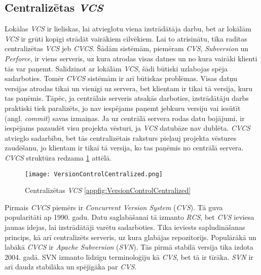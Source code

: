 \subsection{Centralizētas \textit{VCS}}
Lokālas \textit{VCS} ir lieliskas, lai atvieglotu viena izstrādātāja darbu, bet ar lokālām \textit{VCS} ir grūti kopīgi strādāt vairākiem cilvēkiem. Lai to atrisinātu, tika radītas centralizētas \textit{VCS} jeb \textit{CVCS}. Šādām sistēmām, piemēram \textit{CVS}, \textit{Subversion} un \textit{Perforce}, ir viens serveris, uz kura atrodas visas datnes un no kura vairāki klienti tās var paņemt. Salīdzinot ar lokālām \textit{VCS}, šādi būtiski uzlabojas spēja sadarboties. Tomēr \textit{CVCS} sistēmām ir arī būtiskas problēmas. Visas datņu versijas atrodas tikai un vienīgi uz servera, bet klientam ir tikai tā versija, kuru tas paņēmis. Tāpēc, ja centrālais serveris atsakās darboties, izstrādātāju darbs praktiski tiek paralizēts, jo nav iespējams paņemt jebkuru versiju vai iesūtīt (angl. \textit{commit}) savas izmaiņas. Ja uz centrālā servera rodas datu bojājumi, ir iespējams pazaudēt visu projekta vēsturi, ja \textit{VCS} datubāze nav dublēta.
\textit{CVCS} atvieglo sadarbību, bet tās centralizētais raksturs pieļauj projekta vēstures zaudēšanu, jo klientam ir tikai tā versija, ko tas paņēmis no centrālā servera. \textit{CVCS} struktūra redzama \ref{fig:VersionControlCentralized} attēlā. \cite{chacon2014progit}
\begin{figure}[H]%
	\centering
	\captionsetup{justification=centering}
	\texttt{[image: VersionControlCentralized.png]}
	\caption{Centralizētas \textit{VCS} \ref{appfig:VersionControlCentralized}}
	\label{fig:VersionControlCentralized}
\end{figure}
Pirmais \textit{CVCS} piemērs ir \textit{Concurrent Version System} (\textit{CVS}). Tā guva popularitāti ap 1990. gadu. Datu saglabāšanai tā izmanto \textit{RCS}, bet \textit{CVS} ieviesa jaunas idejas, lai izstrādātāji varētu sadarboties. Tika ieviests sapludināšanas princips, kā arī centralizēts serveris, uz kura glabājas repozitorijs.
Populārākā un labākā \textit{CVCS} ir \textit{Apache Subversion} (\textit{SVN}). Tās pirmā stabilā versija tika izdota 2004. gadā. SVN izmanto līdzīgu terminoloģiju kā \textit{CVS}, bet tā ir tīrāka. \textit{SVN} ir arī daudz stabilāka un spējīgāka par \textit{CVS}.
\cite{raymondVCS}

